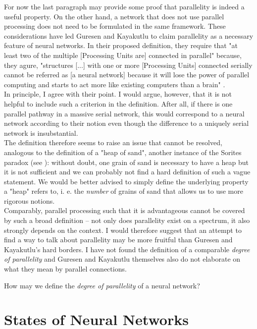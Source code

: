 \documentclass[a4paper,11pt]{article}
\begin{document}
\begin{Abs}
For now the last paragraph may provide some proof that parallelity is indeed a useful property. On the other hand, a network that does not use parallel processing does not need to be formulated in the same framework. These considerations have led Guresen and Kayakutlu \cite{Guresen2011} to claim parallelity as a necessary feature of neural networks. In their proposed definition, they require that "at least two of the multiple [Processing Units are] connected in parallel" \cite[][428]{Guresen2011} because, they agure, "structures [...] with one or more [Processing Units] connected serially cannot be referred as [a neural network] because it will lose the power of parallel computing and starts to act more like existing computers than a brain" \cite[][428]{Guresen2011}.\\
In principle, I agree with their point. I would argue, however, that it is not helpful to include such a criterion in the definition. After all, if there is one parallel pathway in a massive serial network, this would correspond to a neural network according to their notion even though the difference to a uniquely serial network is insubstantial.\\
The definition therefore seems to raise an issue that cannot be resolved, analogous to the definition of a "heap of sand", another instance of the Sorites paradox (see \cite{Hyde2014}): without doubt, one grain of sand is necessary to have a heap but it is not sufficient and we can probably not find a hard definition of such a vague statement. We would be better advised to simply define the underlying property a "heap" refers to, i. e. the \emph{number} of grains of sand that allows us to use more rigorous notions.\\
Comparably, parallel processing such that it is advantageous cannot be covered by such a broad definition -- not only does parallelity exist on a spectrum, it also strongly depends on the context. I would therefore suggest that an attempt to find a way to talk about parallelity may be more fruitful than Guresen and Kayakutlu's hard borders. I have not found the definition of a comparable \emph{degree of parallelity} and Guresen and Kayakutlu themselves also do not elaborate on what they mean by parallel connections.
\begin{OP}
How may we define the \emph{degree of parallelity} of a neural network?
\end{OP}
\end{Abs}
\section{States of Neural Networks}\label{ch:states}
\end{document}
